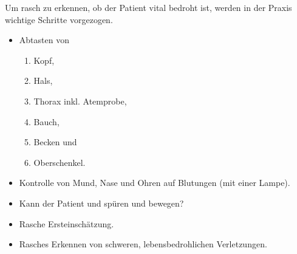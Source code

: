 
{
Um rasch zu erkennen, ob der Patient vital bedroht ist, werden in der Praxis
wichtige Schritte vorgezogen.
\begin{itemize}
    \item Abtasten von

\begin{enumerate}
    \item Kopf,
    \item Hals,
    \item Thorax inkl. Atemprobe,
    \item Bauch,
    \item Becken und 
    \item Oberschenkel.
\end{enumerate} 
\item Kontrolle von Mund, Nase und Ohren auf Blutungen (mit einer
    Lampe).
\item Kann der Patient  und  spüren und bewegen?
\end{itemize}
}
{
\begin{itemize}
    \item Rasche Ersteinschätzung.
    \item Rasches Erkennen von schweren, lebensbedrohlichen Verletzungen.
\end{itemize}
{\SymbolText}
}





